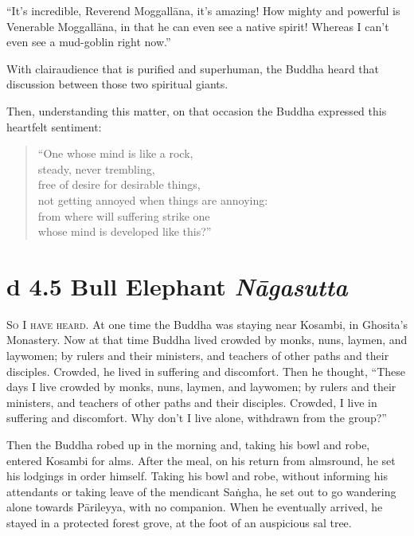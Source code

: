 \documentclass[12pt,openany]{book}%
\newcommand*{\suttatitleacronym}[1]{\smaller[2]{#1}\vspace*{.3em}}
\newcommand*{\suttatitletranslation}[1]{\linebreak{#1}}
\newcommand*{\suttatitleroot}[1]{\linebreak\smaller[2]\itshape{#1}}
\newcommand*{\tocacronym}[1]{\hspace*{-3.3em}{#1}\quad}
\newcommand*{\toctranslation}[1]{#1}
\newcommand*{\tocroot}[1]{(\textit{#1})}
\newcommand*{\scevam}[1]{\textsc{#1}}
\begin{document}
“It’s incredible, Reverend \textsanskrit{Moggallāna}, it’s amazing! How mighty and powerful is Venerable \textsanskrit{Moggallāna}, in that he can even see a native spirit! Whereas I can’t even see a mud-goblin right now.” 

With clairaudience that is purified and superhuman, the Buddha heard that discussion between those two spiritual giants. 

Then, understanding this matter, on that occasion the Buddha expressed this heartfelt sentiment: 

\begin{verse}%
“One whose mind is like a rock, \\
steady, never trembling, \\
free of desire for desirable things, \\
not getting annoyed when things are annoying: \\
from where will suffering strike one \\
whose mind is developed like this?” 

%
\end{verse}

%
\section*{{\suttatitleacronym Ud 4.5}{\suttatitletranslation A Bull Elephant }{\suttatitleroot Nāgasutta}}
\addcontentsline{toc}{section}{\tocacronym{Ud 4.5} \toctranslation{A Bull Elephant } \tocroot{Nāgasutta}}

\scevam{So I have heard. }At one time the Buddha was staying near Kosambi, in Ghosita’s Monastery. Now at that time Buddha lived crowded by monks, nuns, laymen, and laywomen; by rulers and their ministers, and teachers of other paths and their disciples. Crowded, he lived in suffering and discomfort. Then he thought, “These days I live crowded by monks, nuns, laymen, and laywomen; by rulers and their ministers, and teachers of other paths and their disciples. Crowded, I live in suffering and discomfort. Why don’t I live alone, withdrawn from the group?” 

Then the Buddha robed up in the morning and, taking his bowl and robe, entered Kosambi for alms. After the meal, on his return from almsround, he set his lodgings in order himself. Taking his bowl and robe, without informing his attendants or taking leave of the mendicant \textsanskrit{Saṅgha}, he set out to go wandering alone towards \textsanskrit{Pārileyya}, with no companion. When he eventually arrived, he stayed in a protected forest grove, at the foot of an auspicious sal tree. 
\end{document}
